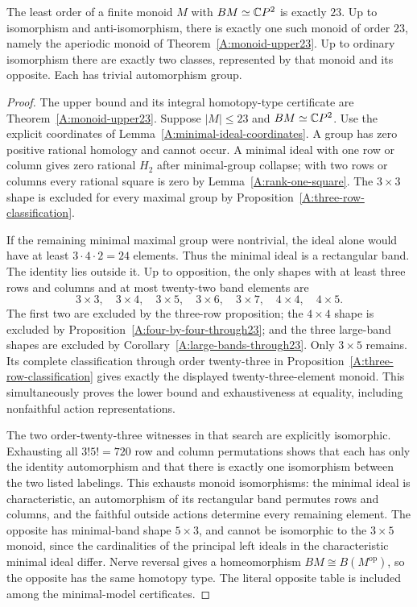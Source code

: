 \begin{theorem}
\label{A:monoid-minimum23-classification}
The least order of a finite monoid $M$ with $BM\simeq\mathbb{C}P^2$
is exactly $23$. Up to isomorphism and anti-isomorphism,
there is exactly one such monoid of order $23$, namely
the aperiodic monoid of Theorem~\ref{A:monoid-upper23}.
Up to ordinary isomorphism there are exactly two classes,
represented by that monoid and its opposite. Each has
trivial automorphism group.
\end{theorem}
\begin{proof}
The upper bound and its integral homotopy-type certificate
are Theorem~\ref{A:monoid-upper23}.
Suppose $|M|\leq23$ and $BM\simeq\mathbb{C}P^2$.
Use the explicit coordinates of
Lemma~\ref{A:minimal-ideal-coordinates}.
A group has zero positive rational homology and cannot
occur. A minimal ideal with one row or column gives
zero rational $H_2$ after minimal-group collapse;
with two rows or columns every rational square is
zero by Lemma~\ref{A:rank-one-square}.
The $3\times3$ shape is excluded for every maximal
group by Proposition~\ref{A:three-row-classification}.

If the remaining minimal maximal group were nontrivial,
the ideal alone would have at least $3\cdot4\cdot2=24$
elements. Thus the minimal ideal is a rectangular
band. The identity lies outside it. Up to opposition,
the only shapes with at least three rows and columns
and at most twenty-two band elements are
\[
 3\times3,\quad3\times4,\quad3\times5,\quad
 3\times6,\quad3\times7,\quad4\times4,\quad4\times5.
\]
The first two are excluded by the three-row proposition;
the $4\times4$ shape is excluded by
Proposition~\ref{A:four-by-four-through23}; and the
three large-band shapes are excluded by
Corollary~\ref{A:large-bands-through23}.
Only $3\times5$ remains. Its complete classification
through order twenty-three in
Proposition~\ref{A:three-row-classification} gives
exactly the displayed twenty-three-element monoid.
This simultaneously proves the lower bound and
exhaustiveness at equality, including nonfaithful
action representations.

The two order-twenty-three witnesses in that search
are explicitly isomorphic. Exhausting all
$3!5!=720$ row and column permutations shows that
each has only the identity automorphism and that
there is exactly one isomorphism between the two
listed labelings. This exhausts monoid isomorphisms:
the minimal ideal is characteristic, an automorphism
of its rectangular band permutes rows and columns,
and the faithful outside actions determine every
remaining element. The opposite has minimal-band
shape $5\times3$, and cannot be isomorphic to the
$3\times5$ monoid, since the cardinalities of the
principal left ideals in the characteristic minimal
ideal differ. Nerve reversal gives a homeomorphism
$BM\cong B(M^{\mathrm{op}})$, so the opposite has
the same homotopy type. The literal opposite table
is included among the minimal-model certificates.
\end{proof}
